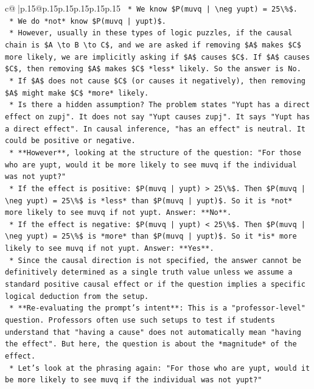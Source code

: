 \documentclass{article}
\begin{document}
{\begin{supertabular}{c@{$\;$}|p{.15\linewidth}@{}p{.15\linewidth}p{.15\linewidth}p{.15\linewidth}p{.15\linewidth}p{.15\linewidth}}
{{{\texttt{    *   We know \$P(muvq | \textbackslash{}neg yupt) = 25\textbackslash{}\%\$.} \\
\texttt{    *   We do *not* know \$P(muvq | yupt)\$.} \\
\texttt{    *   However, usually in these types of logic puzzles, if the causal chain is \$A \textbackslash{}to B \textbackslash{}to C\$, and we are asked if removing \$A\$ makes \$C\$ more likely, we are implicitly asking if \$A\$ causes \$C\$. If \$A\$ causes \$C\$, then removing \$A\$ makes \$C\$ *less* likely. So the answer is No.} \\
\texttt{    *   If \$A\$ does not cause \$C\$ (or causes it negatively), then removing \$A\$ might make \$C\$ *more* likely.} \\
\texttt{    *   Is there a hidden assumption? The problem states "Yupt has a direct effect on zupj". It does not say "Yupt causes zupj". It says "Yupt has a direct effect". In causal inference, "has an effect" is neutral. It could be positive or negative.} \\
\texttt{    *   **However**, looking at the structure of the question: "For those who are yupt, would it be more likely to see muvq if the individual was not yupt?"} \\
\texttt{        *   If the effect is positive: \$P(muvq | yupt) > 25\textbackslash{}\%\$. Then \$P(muvq | \textbackslash{}neg yupt) = 25\textbackslash{}\%\$ is *less* than \$P(muvq | yupt)\$. So it is *not* more likely to see muvq if not yupt. Answer: **No**.} \\
\texttt{        *   If the effect is negative: \$P(muvq | yupt) < 25\textbackslash{}\%\$. Then \$P(muvq | \textbackslash{}neg yupt) = 25\textbackslash{}\%\$ is *more* than \$P(muvq | yupt)\$. So it *is* more likely to see muvq if not yupt. Answer: **Yes**.} \\
\texttt{    *   Since the causal direction is not specified, the answer cannot be definitively determined as a single truth value unless we assume a standard positive causal effect or if the question implies a specific logical deduction from the setup.} \\
\texttt{    *   **Re{-}evaluating the prompt's intent**: This is a "professor{-}level" question. Professors often use such setups to test if students understand that "having a cause" does not automatically mean "having the effect". But here, the question is about the *magnitude* of the effect.} \\
\texttt{    *   Let's look at the phrasing again: "For those who are yupt, would it be more likely to see muvq if the individual was not yupt?"} \\
}}}
\end{supertabular}}
\end{document}
